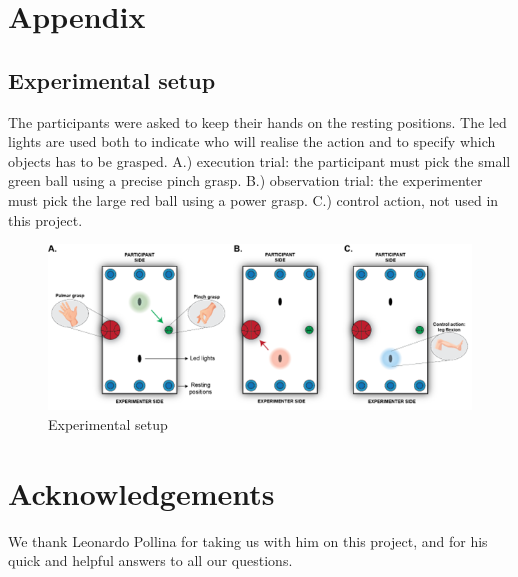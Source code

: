 \documentclass[10pt,conference,compsocconf]{IEEEtran}
\begin{document}


\section{Appendix}
\subsection{Experimental setup}
The participants were asked to keep their hands on the resting positions. The led lights are used both to indicate who will realise the action and to specify which objects has to be grasped. A.) execution trial: the participant must pick the small green ball using a precise pinch grasp. B.) observation trial: the experimenter must pick the large red ball using a power grasp. C.) control action, not used in this project.

\begin{figure}[h!]
    \center
    \includegraphics[width=\linewidth]{images/2024-12-11-13-41-23.png}
    \caption{Experimental setup}
\end{figure}
\FloatBarrier




\section*{Acknowledgements}
We thank Leonardo Pollina for taking us with him on this project, and for his quick and helpful answers to all our questions.



\end{document}
